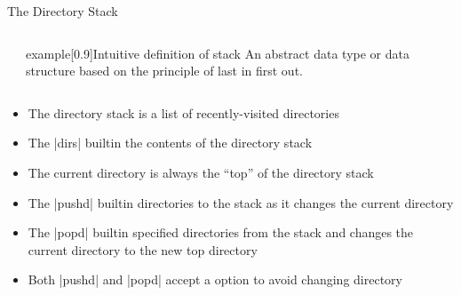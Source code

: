 \begin{frame}{The Directory Stack}{}
    \vspace{-3mm}
    \begin{columns}[c]
        \begin{column}{0.1\textwidth}
        \end{column}
        \begin{column}{0.6\textwidth}
            \begin{varblock}{example}[0.9\textwidth]{Intuitive definition of stack}
                An abstract data type or data structure based on the principle of last in first out.
            \end{varblock}
        \end{column}
        \begin{column}{0.3\textwidth}
        \end{column}
    \end{columns}
    \vspace{6mm}
    \begin{itemize}
        \item The directory stack is a list of recently-visited directories
        \item The \bash|dirs| builtin  the contents of the directory stack \\[1mm]
        \item \alert{The current directory is always the ``top'' of the directory stack}
        \item The \bash|pushd| builtin  directories to the  stack as it changes the current directory
        \item The \bash|popd| builtin  specified directories from the stack and changes the current directory to the new top directory
        \item Both \bash|pushd| and \bash|popd| accept a  option to avoid changing directory
    \end{itemize}
\end{frame}

